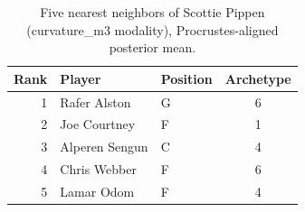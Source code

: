 \begin{table}[htbp]
  \centering\small
  \begin{tabular}{rllc}
    \toprule
    Rank & Player & Position & Archetype \\
    \midrule
    1 & Rafer Alston & G & 6 \\
    2 & Joe Courtney & F & 1 \\
    3 & Alperen Sengun & C & 4 \\
    4 & Chris Webber & F & 6 \\
    5 & Lamar Odom & F & 4 \\
    \bottomrule
  \end{tabular}
  \caption{Five nearest neighbors of Scottie Pippen (curvature_m3 modality), Procrustes-aligned posterior mean.}
  \label{tab:Scottie_Pippen_neighbors_curvature_m3}
\end{table}

